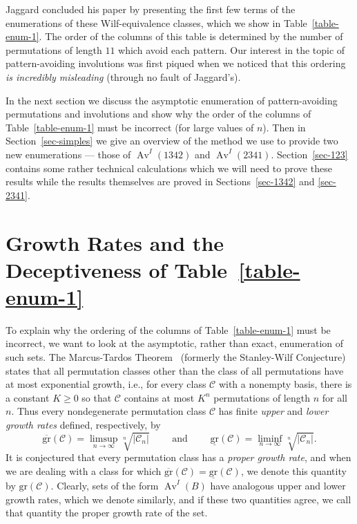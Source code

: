 \documentclass[10pt]{article}
\theoremstyle{plain}
\newcommand{\Av}{\operatorname{Av}}
\newcommand{\C}{\mathcal{C}}
\newcommand{\gr}{\mathrm{gr}}
\newcommand{\lgr}{\underline{\mathrm{gr}}}
\newcommand{\ugr}{\overline{\mathrm{gr}}}
\begin{document}
Jaggard concluded his paper by presenting the first few terms of the enumerations of these Wilf-equivalence classes, which we show in Table~\ref{table-enum-1}. The order of the columns of this table is determined by the number of permutations of length $11$ which avoid each pattern. Our interest in the topic of pattern-avoiding involutions was first piqued when we noticed that this ordering \emph{is incredibly misleading} (through no fault of Jaggard's).

In the next section we discuss the asymptotic enumeration of pattern-avoiding permutations and involutions and show why the order of the columns of Table~\ref{table-enum-1} must be incorrect (for large values of $n$). Then in Section~\ref{sec-simples} we give an overview of the method we use to provide two new enumerations --- those of $\Av^I(1342)$ and $\Av^I(2341)$. Section~\ref{sec-123} contains some rather technical calculations which we will need to prove these results while the results themselves are proved in Sections~\ref{sec-1342} and \ref{sec-2341}.

%
%
%
%
%
%
%
%
%
%
%
%

\section{Growth Rates and the Deceptiveness of Table~\ref{table-enum-1}}\label{section:grs}

To explain why the ordering of the columns of Table~\ref{table-enum-1} must be incorrect, we want to look at the asymptotic, rather than exact, enumeration of such sets. The Marcus-Tardos Theorem~\cite{marcus:excluded-permut:} (formerly the Stanley-Wilf Conjecture) states that all permutation classes other than the class of all permutations have at most exponential growth, i.e., for every class $\C$ with a nonempty basis, there is a constant $K\ge 0$ so that $\C$ contains at most $K^n$ permutations of length $n$ for all $n$. Thus every nondegenerate permutation class $\C$ has finite {\it upper\/} and {\it lower growth rates\/} defined, respectively, by
\[
	\ugr(\C) = \limsup_{n\rightarrow\infty}\sqrt[n]{|\C_n|}
		\qquad \text{ and } \qquad
	\lgr(\C) = \liminf_{n\rightarrow\infty}\sqrt[n]{|\C_n|}.
\]
It is conjectured that every permutation class has a {\it proper growth rate\/}, and when we are dealing with a class for which $\ugr(\C)=\lgr(\C)$, we denote this quantity by $\gr(\C)$. Clearly, sets of the form $\Av^I(B)$ have analogous upper and lower growth rates, which we denote similarly, and if these two quantities agree, we call that quantity the proper growth rate of the set.
\end{document}

